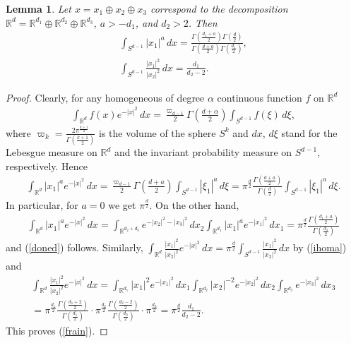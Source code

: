 \documentclass[10pt]{amsart}
\newtheorem{lemma}{Lemma}
\theoremstyle{remark}
\begin{document}
\begin{lemma}
Let $x=x_1\oplus x_2\oplus x_3$ correspond to the decomposition
${\mathbb{R}}^d={\mathbb{R}}^{d_1}\oplus{\mathbb{R}}^{d_2}\oplus{\mathbb{R}}^{d_3}$, $a>-d_1$, and
$d_2>2$. Then
\begin{eqnarray}\label{doned}
\int_{S^{d-1}}|x_1|^a\,dx=
\frac{{{\mathord{\Gamma}}}\left(\frac{d_1+a}{2}\right){{\mathord{\Gamma}}}\left(\frac{d}{2}\right)}
{{{\mathord{\Gamma}}}\left(\frac{d+a}{2}\right){{\mathord{\Gamma}}}\left(\frac{d_1}{2}\right)},\\
\label{frain}\int_{S^{d-1}}\frac{|x_1|^2}{|x_2|^2}\,dx=
\frac{d_1}{d_2-2}.
\end{eqnarray}
\end{lemma}
\begin{proof}
Clearly, for any homogeneous of degree ${{\mathord{\alpha}}}$ continuous function
$f$ on ${\mathbb{R}}^d$
\begin{eqnarray}\label{ihoma}
\int_{{\mathbb{R}}^d} f(x)e^{-|x|^2}\,dx
=\frac{\varpi_{d-1}}{2}{{\mathord{\Gamma}}}\left(\frac{d+{{\mathord{\alpha}}}}{2}\right)
\int_{S^{d-1}}f(\xi)\,d\xi,
\end{eqnarray}
where
$\varpi_k=\frac{2\pi^{\frac{k+1}{2}}}{{{\mathord{\Gamma}}}\left(\frac{k+1}{2}\right)}$
is the volume of the sphere $S^k$ and $dx$, $d\xi$ stand for the
Lebesgue measure on ${\mathbb{R}}^d$ and the invariant probability measure
on $S^{d-1}$, respectively. Hence
\begin{eqnarray*}
\int_{{\mathbb{R}}^d}|x_1|^ae^{-|x|^2}\,dx=\frac{\varpi_{d-1}}{2}
{{\mathord{\Gamma}}}\left(\frac{d+a}{2}\right)\int_{S^{d-1}}|\xi_1|^a\,d\xi
=\pi^{\frac{d}{2}}\frac{{{\mathord{\Gamma}}}\left(\frac{d+a}{2}\right)}
{{{\mathord{\Gamma}}}\left(\frac{d}{2}\right)} \int_{S^{d-1}}|\xi_1|^a\,d\xi.
\end{eqnarray*}
In particular, for $a=0$ we get $\pi^{\frac{d}{2}}$. On the other
hand,
\begin{eqnarray*}
\int_{{\mathbb{R}}^d}|x_1|^ae^{-|x|^2}\,dx
=\int_{{\mathbb{R}}^{d_2+d_3}}e^{-|x_2|^2-|x_3|^2}\,dx_2
\int_{{\mathbb{R}}^{d_1}}|x_1|^ae^{-|x_1|^2}\,dx_1 =\pi^{\frac{d}{2}}
\frac{{{\mathord{\Gamma}}}\left(\frac{d_1+a}{2}\right)}{{{\mathord{\Gamma}}}\left(\frac{d_1}{2}\right)}
\end{eqnarray*}
and (\ref{doned}) follows. Similarly,
$\int_{{\mathbb{R}}^d}\frac{|x_1|^2}{|x_2|^2}e^{-|x|^2}\,dx
=\pi^{\frac{d}{2}}\int_{S^{d-1}}\frac{|x_1|^2}{|x_2|^2}\,dx$ by
(\ref{ihoma}) and
\begin{eqnarray*}
\int_{{\mathbb{R}}^d}\frac{|x_1|^2}{|x_2|^2}e^{-|x|^2}\,dx=
\int_{{\mathbb{R}}^{d_1}}|x_1|^2e^{-|x_1|^2}\,dx_1
\int_{{\mathbb{R}}^{d_2}}|x_2|^{-2}e^{-|x_2|^2}\,dx_2
\int_{{\mathbb{R}}^{d_3}}e^{-|x_3|^2}\,dx_3\\
=\pi^{\frac{d_1}{2}}\frac{{{\mathord{\Gamma}}}\left(\frac{d_1+2}{2}\right)}
{{{\mathord{\Gamma}}}\left(\frac{d_1}{2}\right)}\cdot
\pi^{\frac{d_2}{2}}\frac{{{\mathord{\Gamma}}}\left(\frac{d_2-2}{2}\right)}
{{{\mathord{\Gamma}}}\left(\frac{d_2}{2}\right)}\cdot \pi^{\frac{d_3}{2}}=
\pi^{\frac{d}{2}}\frac{d_1}{d_2-2}.
\end{eqnarray*}
This proves (\ref{frain}).
\end{proof}
\end{document}
